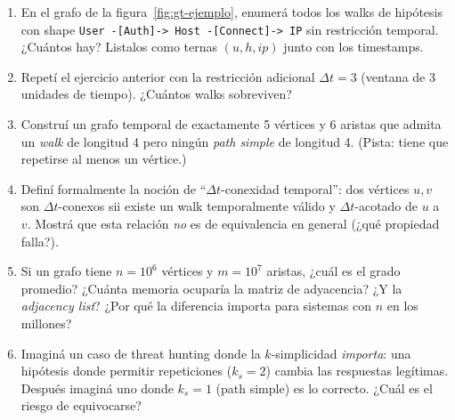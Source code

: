 \begin{ejercicios}
\begin{enumerate}
    \item \starred{} En el grafo de la figura~\ref{fig:gt-ejemplo},
    enumerá todos los walks de hipótesis con shape
    \texttt{User -[Auth]-> Host -[Connect]-> IP} sin restricción
    temporal. ¿Cuántos hay? Listalos como ternas \((u, h, \mathit{ip})\)
    junto con los timestamps.

    \item Repetí el ejercicio anterior con la restricción adicional
    \(\Delta t = 3\) (ventana de 3 unidades de tiempo). ¿Cuántos
    walks sobreviven?

    \item Construí un grafo temporal de exactamente 5 vértices y 6
    aristas que admita un \emph{walk} de longitud 4 pero ningún
    \emph{path simple} de longitud 4. (Pista: tiene que repetirse
    al menos un vértice.)

    \item \starred{} Definí formalmente la noción de
    ``\(\Delta t\)-conexidad temporal'': dos vértices \(u, v\) son
    \(\Delta t\)-conexos sii existe un walk temporalmente válido y
    \(\Delta t\)-acotado de \(u\) a \(v\). Mostrá que esta relación
    \emph{no} es de equivalencia en general (¿qué propiedad falla?).

    \item Si un grafo tiene \(n = 10^6\) vértices y \(m = 10^7\)
    aristas, ¿cuál es el grado promedio? ¿Cuánta memoria ocuparía la
    matriz de adyacencia? ¿Y la \emph{adjacency list}? ¿Por qué la
    diferencia importa para sistemas con \(n\) en los millones?

    \item Imaginá un caso de threat hunting donde la \(k\)-simplicidad
    \emph{importa}: una hipótesis donde permitir
    repeticiones (\(k_s = 2\)) cambia las respuestas legítimas.
    Después imaginá uno donde \(k_s = 1\) (path simple) es lo
    correcto. ¿Cuál es el riesgo de equivocarse?
\end{enumerate}
\end{ejercicios}

